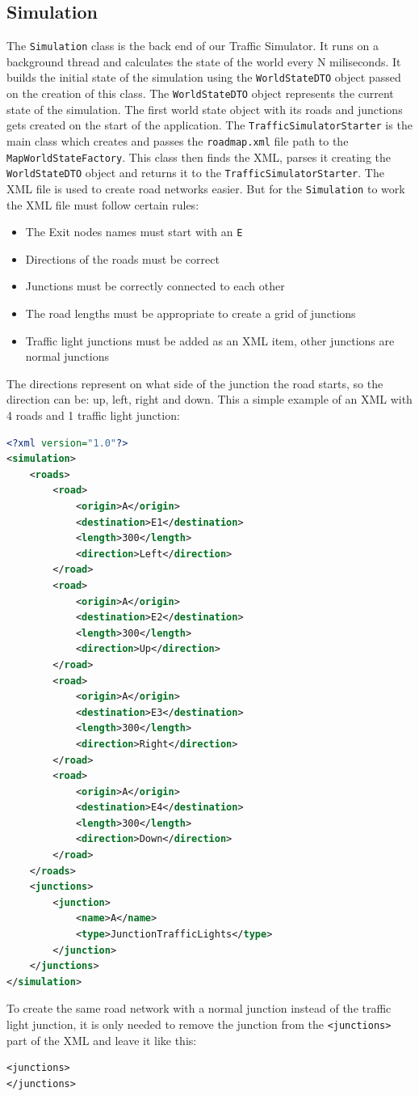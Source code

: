 \documentclass[a4paper,12pt]{article}
\begin{document}
\subsection{Simulation}
The \verb|Simulation| class is the back end of our Traffic Simulator. It runs on a background thread and calculates the state of the world every N miliseconds. It builds the initial state of the simulation using the \verb|WorldStateDTO| object passed on the creation of this class.
\newline
The \verb|WorldStateDTO| object represents the current state of the simulation. The first world state object with its roads and junctions gets created on the start of the application. The \verb|TrafficSimulatorStarter| is the main class which creates and passes the \verb|roadmap.xml| file path to the \verb|MapWorldStateFactory|.
This class then finds the XML, parses it creating the \verb|WorldStateDTO| object and returns it to the \verb|TrafficSimulatorStarter|.
\newline
The XML file is used to create road networks easier. But for the \verb|Simulation| to work the XML file must follow certain rules:
\begin{itemize}
	\item The Exit nodes names must start with an \verb|E|
	\item Directions of the roads must be correct
	\item Junctions must be correctly connected to each other
  \item The road lengths must be appropriate to create a grid of junctions
	\item Traffic light junctions must be added as an XML item, other junctions are normal junctions
\end{itemize}
The directions represent on what side of the junction the road starts, so the direction can be: up, left, right and down.
This a simple example of an XML with 4 roads and 1 traffic light junction:
\begin{lstlisting}[language=XML]
<?xml version="1.0"?>
<simulation>
	<roads>
		<road>
			<origin>A</origin>
			<destination>E1</destination>
			<length>300</length>
			<direction>Left</direction>
		</road>
		<road>
			<origin>A</origin>
			<destination>E2</destination>
			<length>300</length>
			<direction>Up</direction>
		</road>
		<road>
			<origin>A</origin>
			<destination>E3</destination>
			<length>300</length>
			<direction>Right</direction>
		</road>
		<road>
			<origin>A</origin>
			<destination>E4</destination>
			<length>300</length>
			<direction>Down</direction>
		</road>
	</roads>
	<junctions>
		<junction>
			<name>A</name>
			<type>JunctionTrafficLights</type>
		</junction>
	</junctions>
</simulation>
\end{lstlisting}
To create the same road network with a normal junction instead of the traffic light junction, it is only needed to remove the junction from the \verb|<junctions>| part of the XML and leave it like this:
\begin{lstlisting}
<junctions>
</junctions>
\end{lstlisting}
\end{document}
